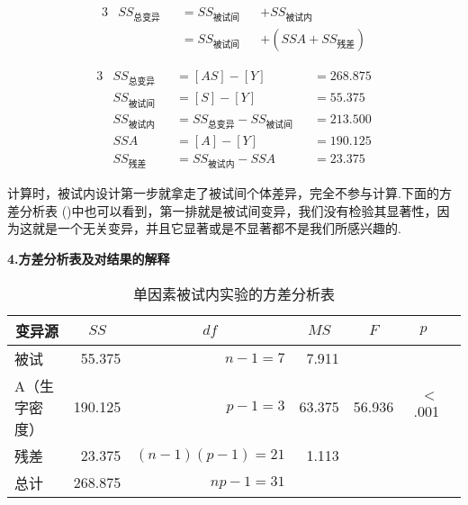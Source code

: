 \begin{definition}[单因素被试内和方分解]
\begin{alignat*}{3}
    & SS_{\text{总变异}}      &&  = SS_{\text{被试间}}  && + SS_{\text{被试内}}\\ 
    &                         && = SS_{\text{被试间}}  && + (SSA + SS_{\text{残差}})
\end{alignat*}
\end{definition}

\begin{alignat*}{3}
    &    SS_{\text{总变异}}    & & =[AS]-[Y]                               && =268.875\\
    &    SS_{\text{被试间}}     & & =[S]-[Y]                                &&   =55.375\\
    &    SS_{\text{被试内}}     & & =SS_{\text{总变异}}-SS_{\text{被试间}}  &&   =213.500\\
    &    SSA                  & & =[A]-[Y]                                && =190.125\\
    &    SS_{\text{残差}}     & & =SS_{\text{被试内}}-SSA              &&  =23.375
\end{alignat*}

计算时，被试内设计第一步就拿走了被试间个体差异，完全不参与计算.下面的方差分析表
()中也可以看到，第一排就是被试间变异，我们没有检验其显著性，因为这就是一个无关变异，并且它显著或是不显著都不是我们所感兴趣的.

\textbf{4.方差分析表及对结果的解释}
\begin{table}[h]
	\centering
	\caption{单因素被试内实验的方差分析表}
	{
		\begin{tabular}{lrrrrrr}
			\toprule
			\multicolumn{1}{c}{变异源} & \multicolumn{1}{c}{$SS$} & \multicolumn{1}{c}{$df$} & \multicolumn{1}{c}{$MS$} & \multicolumn{1}{c}{$F$} & \multicolumn{1}{c}{$p$} \\
			\midrule
			被试 & 55.375 & $n-1=7$ & 7.911    \\
			A（生字密度） & 190.125 & $p-1=3$ & 63.375 & 56.936 & $<$ .001  \\
			残差 & 23.375 & $(n-1)(p-1)=21$ & 1.113\\
			\midrule
			总计 & 268.875 & $np-1=31$ & & &\\
			\bottomrule
		\end{tabular}
	}
\end{table}

